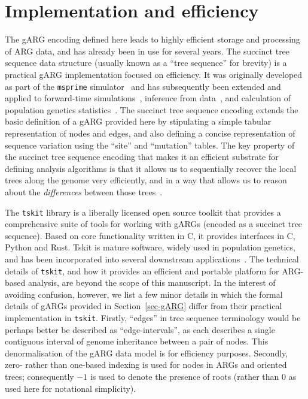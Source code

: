 \documentclass{article}
\begin{document}
\section{Implementation and efficiency}
\label{sec-efficiency}
The gARG encoding defined here
leads to highly efficient storage and processing of ARG data,
and has already been in use for several years.
The succinct tree sequence data structure
(usually known as a ``tree sequence'' for brevity)
is a practical gARG implementation focused on efficiency.
It was originally developed as part of the \texttt{msprime}
simulator~\citep{kelleher2016efficient} and has subsequently been
extended and applied to forward-time
simulations~\citep{kelleher2018efficient,haller2018tree},
inference from data~\citep{kelleher2019inferring,wohns2022unified},
and calculation of population genetics statistics~\citep{ralph2020efficiently}.
The succinct tree sequence encoding extends the basic definition
of a gARG provided here by stipulating a
simple tabular representation of nodes and edges,
and also defining a concise representation of
sequence variation using the ``site'' and  ``mutation'' tables.
The key property of the succinct tree sequence encoding
that makes it an efficient substrate for defining analysis
algorithms is that it allows us to sequentially
recover the local trees along the genome very efficiently,
and in a way that allows us to reason about the \emph{differences}
between those trees~\citep{kelleher2016efficient,ralph2020efficiently}.

The \texttt{tskit} library is a liberally
licensed open source toolkit that provides a comprehensive suite
of tools for working with gARGs (encoded as a succinct tree sequence).
Based on core functionality written
in C, it provides interfaces in C, Python and Rust.
Tskit is mature software, widely used in population genetics, and
has been incorporated into several downstream
applications~\citep[e.g.,][]{haller2019slim,speidel2019method,
adrion2020community,
terasaki2021geonomics,
baumdicker2021efficient,
fan2022genealogical,
guo2022recombination,
korfmann2022weak,
mahmoudi2022bayesian,
petr2022slendr,
rasmussen2022espalier,
zhang2023biobank,
nowbandegani2023extremely,
ignatieva2023distribution,
fan2023likelihood}.
The technical details of \texttt{tskit}, and how it provides an
efficient and portable platform for ARG-based analysis, are beyond
the scope of this manuscript.
In the interest of avoiding confusion, however, we list a
few minor details in which the formal details of gARGs
provided in Section~\ref{sec-gARG} differ from their practical implementation in
\texttt{tskit}.
Firstly, ``edges'' in tree sequence terminology would be perhaps better be
described as ``edge-intervals'', as each describes a single contiguous
interval of genome inheritance between a pair of nodes.
This denormalisation of the gARG data model is for efficiency purposes.
Secondly, zero- rather than one-based indexing is used for
nodes in ARGs and oriented trees; consequently  $-1$ is used to denote the presence of
roots (rather than $0$ as used here for notational simplicity).
\end{document}
